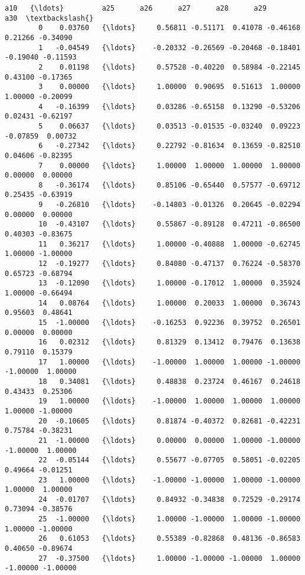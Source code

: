 \documentclass[11pt]{article}
\begin{document}
\begin{Verbatim}[commandchars=\\\{\}]
                 a10   {\ldots}         a25      a26      a27      a28      a29      a30  \textbackslash{}
        0    0.03760   {\ldots}     0.56811 -0.51171  0.41078 -0.46168  0.21266 -0.34090   
        1   -0.04549   {\ldots}    -0.20332 -0.26569 -0.20468 -0.18401 -0.19040 -0.11593   
        2    0.01198   {\ldots}     0.57528 -0.40220  0.58984 -0.22145  0.43100 -0.17365   
        3    0.00000   {\ldots}     1.00000  0.90695  0.51613  1.00000  1.00000 -0.20099   
        4   -0.16399   {\ldots}     0.03286 -0.65158  0.13290 -0.53206  0.02431 -0.62197   
        5    0.06637   {\ldots}     0.03513 -0.01535 -0.03240  0.09223 -0.07859  0.00732   
        6   -0.27342   {\ldots}     0.22792 -0.81634  0.13659 -0.82510  0.04606 -0.82395   
        7    0.00000   {\ldots}     1.00000  1.00000  1.00000  1.00000  0.00000  0.00000   
        8   -0.36174   {\ldots}     0.85106 -0.65440  0.57577 -0.69712  0.25435 -0.63919   
        9   -0.26810   {\ldots}    -0.14803 -0.01326  0.20645 -0.02294  0.00000  0.00000   
        10  -0.43107   {\ldots}     0.55867 -0.89128  0.47211 -0.86500  0.40303 -0.83675   
        11   0.36217   {\ldots}     1.00000 -0.40888  1.00000 -0.62745  1.00000 -1.00000   
        12  -0.19277   {\ldots}     0.84080 -0.47137  0.76224 -0.58370  0.65723 -0.68794   
        13  -0.12090   {\ldots}     1.00000 -0.17012  1.00000  0.35924  1.00000 -0.66494   
        14   0.08764   {\ldots}     1.00000  0.20033  1.00000  0.36743  0.95603  0.48641   
        15  -1.00000   {\ldots}    -0.16253  0.92236  0.39752  0.26501  0.00000  0.00000   
        16   0.02312   {\ldots}     0.81329  0.13412  0.79476  0.13638  0.79110  0.15379   
        17   1.00000   {\ldots}    -1.00000  1.00000  1.00000 -1.00000 -1.00000  1.00000   
        18   0.34081   {\ldots}     0.48838  0.23724  0.46167  0.24618  0.43433  0.25306   
        19   1.00000   {\ldots}    -1.00000  1.00000  1.00000  1.00000  1.00000 -1.00000   
        20  -0.10605   {\ldots}     0.81874 -0.40372  0.82681 -0.42231  0.75784 -0.38231   
        21  -1.00000   {\ldots}     0.00000  0.00000  1.00000 -1.00000 -1.00000  1.00000   
        22  -0.05144   {\ldots}     0.55677 -0.07705  0.58051 -0.02205  0.49664 -0.01251   
        23   1.00000   {\ldots}    -1.00000 -1.00000  1.00000 -1.00000  1.00000  1.00000   
        24  -0.01707   {\ldots}     0.84932 -0.34838  0.72529 -0.29174  0.73094 -0.38576   
        25  -1.00000   {\ldots}     1.00000 -1.00000  1.00000 -1.00000  1.00000 -1.00000   
        26   0.61053   {\ldots}     0.55389 -0.82868  0.48136 -0.86583  0.40650 -0.89674   
        27  -0.37500   {\ldots}     1.00000 -1.00000 -1.00000  1.00000 -1.00000 -1.00000   

\end{Verbatim}
\end{document}
